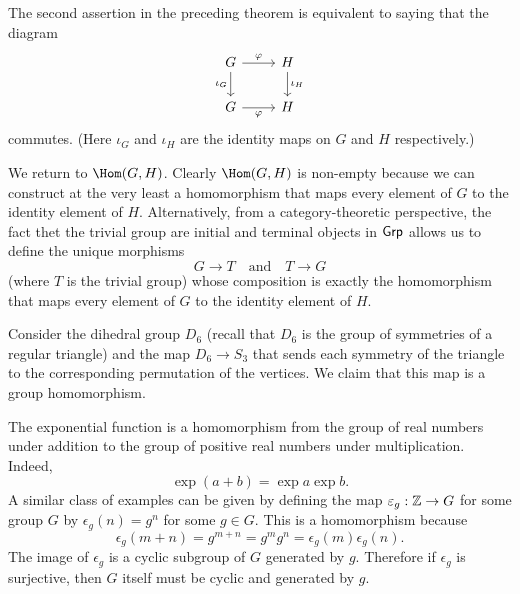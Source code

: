 \begin{remark}
    The second assertion in the preceding theorem is equivalent to saying that the diagram
    \[
        \begin{tikzcd}
            G \arrow{r}{\phi} \arrow[swap]{d}{\iota_G} & H \arrow{d}{\iota_H} \\
            G \arrow[swap]{r}{\phi} & H
        \end{tikzcd}
    \]
    commutes. (Here \(\iota_G\) and \(\iota_H\) are the identity maps on \(G\) and \(H\) respectively.)
\end{remark}

\begin{example}
    We return to \(\Hom(G, H)\). Clearly \(\Hom(G, H)\) is non-empty because we can construct at the very least a homomorphism that maps every element of \(G\) to the identity element of \(H\). Alternatively, from a category-theoretic perspective, the fact thet the trivial group are initial and terminal objects in \(\mathsf{Grp}\) allows us to define the unique morphisms
    \[
        G \to T \quad \text{and} \quad T \to G
    \]
    (where \(T\) is the trivial group) whose composition is exactly the homomorphism that maps every element of \(G\) to the identity element of \(H\).
\end{example}

\begin{example}
    Consider the dihedral group \(D_6\) (recall that \(D_6\) is the group of symmetries of a regular triangle) and the map \(D_6 \to S_3\) that sends each symmetry of the triangle to the corresponding permutation of the vertices. We claim that this map is a group homomorphism.
\end{example}

\begin{example}
    The exponential function is a homomorphism from the group of real numbers under addition to the group of positive real numbers under multiplication. Indeed,
    \[
        \exp (a + b) = \exp a \exp b.
    \]
    A similar class of examples can be given by defining the map \(\varepsilon_g : \mathbb{Z} \to G\) for some group \(G\) by \(\epsilon_g(n) = g^n\) for some \(g \in G\). This is a homomorphism because
    \[
        \epsilon_g(m + n) = g^{m + n} = g^m g^n = \epsilon_g(m) \epsilon_g(n).
    \]
    The image of \(\epsilon_g\) is a cyclic subgroup of \(G\) generated by \(g\). Therefore if \(\epsilon_g\) is surjective, then \(G\) itself must be cyclic and generated by \(g\).
\end{example}

